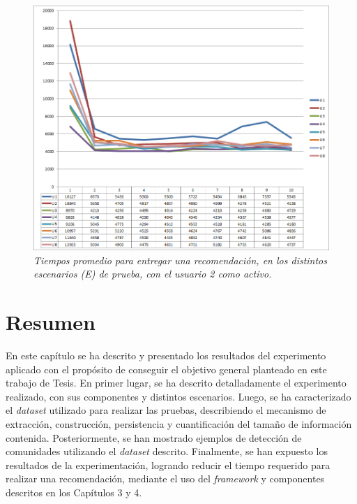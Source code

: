 \begin{figure}[H]
  \centering
  \includegraphics[scale=.7]{images/Figura5-9}
  \caption{\em Tiempos promedio para entregar una recomendación, en los distintos escenarios (E) de prueba, con el usuario 2 como activo.}
  \label{fig:exp-im9}
\end{figure}

\section{Resumen}

En este capítulo se ha descrito y presentado los resultados del experimento aplicado con el propósito de conseguir el objetivo general planteado en este trabajo de Tesis. En primer lugar, se ha descrito detalladamente el experimento realizado, con sus componentes y distintos escenarios. Luego, se ha caracterizado el \textit{data\textit{set}} utilizado para realizar las pruebas, describiendo el mecanismo de extracción, construcción, persistencia y cuantificación del tamaño de información contenida. Posteriormente, se han mostrado ejemplos de detección de comunidades utilizando el \textit{data\textit{set}} descrito. Finalmente, se han expuesto los resultados de la experimentación, logrando reducir el tiempo requerido para realizar una recomendación, mediante el uso del \textit{framework} y componentes descritos en los Capítulos 3 y 4.
